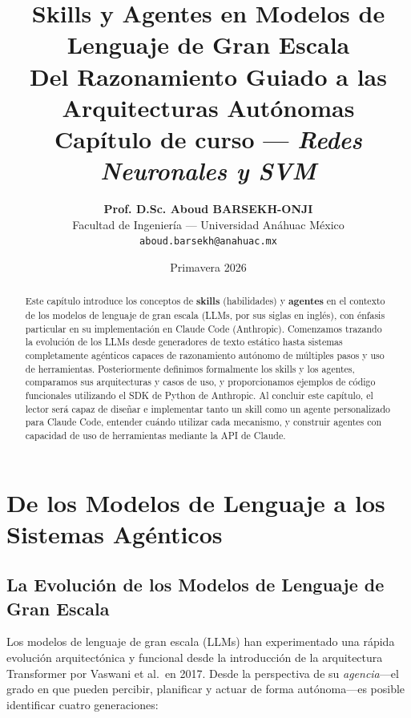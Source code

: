 \documentclass[11pt,letterpaper]{article}
\title{
    \LARGE \textbf{Skills y Agentes en Modelos de Lenguaje de Gran Escala} \\[0.3cm]
    \large Del Razonamiento Guiado a las Arquitecturas Autónomas \\[0.5cm]
    \normalsize Capítulo de curso --- \textit{Redes Neuronales y SVM}
}
\author{
    \textbf{Prof. D.Sc. Aboud BARSEKH-ONJI} \\
    Facultad de Ingeniería --- Universidad Anáhuac México \\
    \texttt{aboud.barsekh@anahuac.mx}
}
\date{Primavera 2026}
\begin{document}

\maketitle
\thispagestyle{fancy}

\begin{abstract}
Este capítulo introduce los conceptos de \textbf{skills} (habilidades) y \textbf{agentes} en el contexto de los modelos de lenguaje de gran escala (LLMs, por sus siglas en inglés), con énfasis particular en su implementación en Claude Code (Anthropic). Comenzamos trazando la evolución de los LLMs desde generadores de texto estático hasta sistemas completamente agénticos capaces de razonamiento autónomo de múltiples pasos y uso de herramientas. Posteriormente definimos formalmente los skills y los agentes, comparamos sus arquitecturas y casos de uso, y proporcionamos ejemplos de código funcionales utilizando el SDK de Python de Anthropic. Al concluir este capítulo, el lector será capaz de diseñar e implementar tanto un skill como un agente personalizado para Claude Code, entender cuándo utilizar cada mecanismo, y construir agentes con capacidad de uso de herramientas mediante la API de Claude.
\end{abstract}

\tableofcontents
\newpage

\section{De los Modelos de Lenguaje a los Sistemas Agénticos}

\subsection{La Evolución de los Modelos de Lenguaje de Gran Escala}

Los modelos de lenguaje de gran escala (LLMs) han experimentado una rápida evolución arquitectónica y funcional desde la introducción de la arquitectura Transformer por Vaswani et al.\ en 2017. Desde la perspectiva de su \emph{agencia}---el grado en que pueden percibir, planificar y actuar de forma autónoma---es posible identificar cuatro generaciones:
\end{document}
